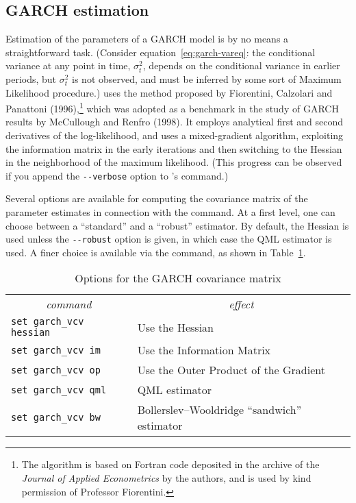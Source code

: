 \subsection{GARCH estimation}
\label{subsec:garch-est}

Estimation of the parameters of a GARCH model is by no means a
straightforward task.  (Consider equation~\ref{eq:garch-vareq}: the
conditional variance at any point in time, $\sigma^2_t$, depends on
the conditional variance in earlier periods, but $\sigma^2_t$ is not
observed, and must be inferred by some sort of Maximum Likelihood
procedure.)   uses the method proposed by Fiorentini,
Calzolari and Panattoni (1996),\footnote{The algorithm is based on
  Fortran code deposited in the archive of the \textit{Journal of
    Applied Econometrics} by the authors, and is used by kind
  permission of Professor Fiorentini.}  which was adopted as a
benchmark in the study of GARCH results by McCullough and Renfro
(1998).  It employs analytical first and second derivatives of the
log-likelihood, and uses a mixed-gradient algorithm, exploiting the
information matrix in the early iterations and then switching to the
Hessian in the neighborhood of the maximum likelihood.  (This progress
can be observed if you append the \verb|--verbose| option to
's  command.)

Several options are available for computing the covariance matrix of
the parameter estimates in connection with the  command.
At a first level, one can choose between a ``standard'' and a
``robust'' estimator.  By default, the Hessian is used unless the
\verb|--robust| option is given, in which case the QML estimator is
used.  A finer choice is available via the  command, as
shown in Table~\ref{tab:garch-vcv}.

\begin{table}[htbp]
\caption{Options for the GARCH covariance matrix}
\label{tab:garch-vcv}
\begin{center}
\begin{tabular}{ll}
\multicolumn{1}{c}{\textit{command}} &
\multicolumn{1}{c}{\textit{effect}} \\ [4pt]
\texttt{set garch\_vcv hessian} & Use the Hessian \\
\texttt{set garch\_vcv im} & Use the Information Matrix \\
\texttt{set garch\_vcv op} & Use the Outer Product of the Gradient \\
\texttt{set garch\_vcv qml} & QML estimator \\
\texttt{set garch\_vcv bw} & Bollerslev--Wooldridge ``sandwich'' estimator
\end{tabular}
\end{center}
\end{table}

